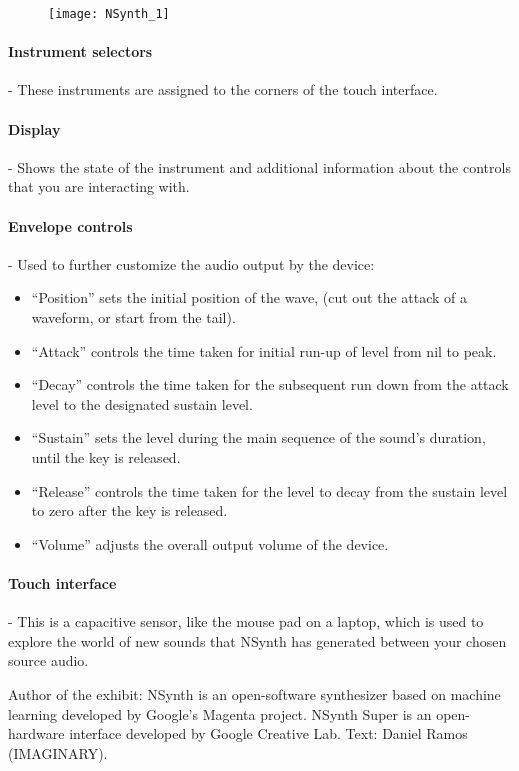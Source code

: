 \begin{figure}[h]
\centering
\texttt{[image: NSynth\_1]}
\end{figure}

\paragraph{Instrument selectors} - These instruments are assigned to the corners of the touch interface. 

\paragraph{Display} - Shows the state of the instrument and additional information about the controls that you are interacting with.

\paragraph{Envelope controls} - Used to further customize the audio output by the device:
\begin{itemize}
\item ``Position'' sets the initial position of the wave, (cut out the attack of a waveform, or start from the tail).
\item ``Attack'' controls the time taken for initial run-up of level from nil to peak.
\item ``Decay'' controls the time taken for the subsequent run down from the attack level to the designated sustain level.
\item ``Sustain'' sets the level during the main sequence of the sound's duration, until the key is released.
\item ``Release'' controls the time taken for the level to decay from the sustain level to zero after the key is released.
\item ``Volume'' adjusts the overall output volume of the device.
\end{itemize}

\paragraph{Touch interface} - This is a capacitive sensor, like the mouse pad on a laptop, which is used to explore the world of new sounds that NSynth has generated between your chosen source audio.

\vfill

Author of the exhibit: NSynth is an open-software synthesizer based on machine learning developed by Google's Magenta project. NSynth Super is an open-hardware interface developed by Google Creative Lab. Text: Daniel Ramos (IMAGINARY).

